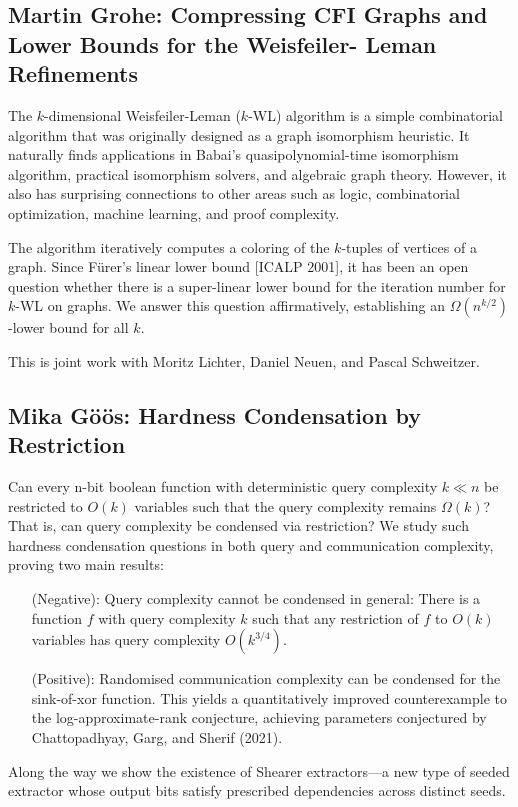 \documentclass[11pt]{article}
\begin{document}
\subsection*{Martin Grohe: Compressing CFI Graphs and Lower Bounds for the Weisfeiler-
Leman Refinements}\label{Grohe}

The $k$-dimensional Weisfeiler-Leman ($k$-WL) algorithm is a simple combinatorial algorithm that was originally designed as a graph isomorphism heuristic. It naturally finds applications in Babai's quasipolynomial-time isomorphism algorithm, practical isomorphism solvers, and algebraic graph theory. However, it also has surprising connections to other areas such as logic, combinatorial optimization, machine learning, and proof complexity.

The algorithm iteratively computes a coloring of the $k$-tuples of vertices of a graph. Since F\"{u}rer's linear lower bound [ICALP 2001], it has been an open question whether there is a super-linear lower bound for the iteration number for $k$-WL on graphs. We answer this question affirmatively, establishing an $\Omega(n^{k/2})$-lower bound for all $k$.

This is joint work with Moritz Lichter, Daniel Neuen, and Pascal Schweitzer.

\subsection*{Mika G\"{o}\"{o}s: Hardness Condensation by Restriction}\label{Goos}
Can every n-bit boolean function with deterministic query complexity $k \ll n$ be restricted to $O(k)$ variables such that the query complexity remains $\Omega(k)$? That is, can query complexity be condensed via restriction? We study such hardness condensation questions in both query and communication complexity, proving two main results:
\begin{itemize}
\item[(Negative):] Query complexity cannot be condensed in general: There is a function $f$ with query complexity $k$ such that any restriction of $f$ to $O(k)$ variables has query complexity $O(k^{3/4})$.

\item[(Positive):] Randomised communication complexity can be condensed for the sink-of-xor function. This yields a quantitatively improved counterexample to the log-approximate-rank conjecture, achieving parameters conjectured by Chattopadhyay, Garg, and Sherif (2021).
\end{itemize}
Along the way we show the existence of Shearer extractors---a new type of seeded extractor whose output bits satisfy prescribed dependencies across distinct seeds.
\end{document}
